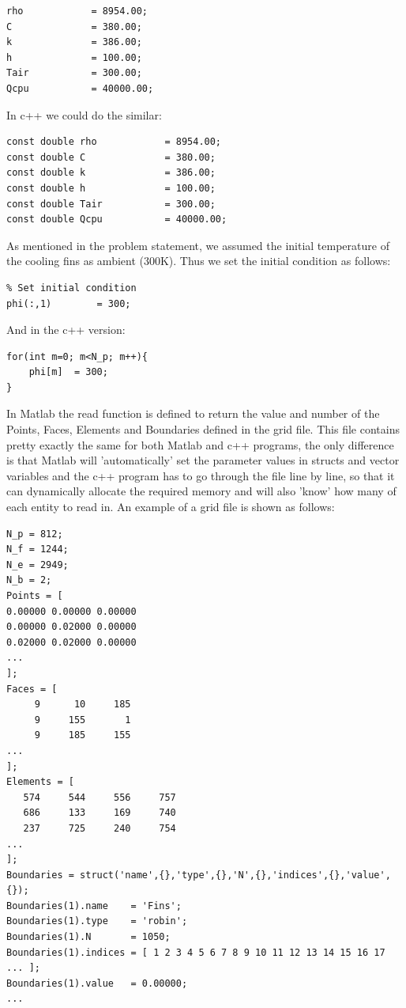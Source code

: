 \documentclass[12pt]{article}
\begin{document}
\begin{lstlisting}
rho            = 8954.00;
C              = 380.00;
k              = 386.00;
h              = 100.00;
Tair           = 300.00;
Qcpu           = 40000.00;
\end{lstlisting}

In c++ we could do the similar:

\begin{lstlisting}[style=MyC++Style]
const double rho            = 8954.00;
const double C              = 380.00;
const double k              = 386.00;
const double h              = 100.00;
const double Tair           = 300.00;
const double Qcpu           = 40000.00;
\end{lstlisting}

As mentioned in the problem statement, we assumed the initial temperature of the cooling fins as ambient (300K). Thus we set the initial condition as follows:

\begin{lstlisting}
% Set initial condition
phi(:,1)        = 300;
\end{lstlisting}

And in the c++ version:

\begin{lstlisting}[style=MyC++Style]
for(int m=0; m<N_p; m++){
	phi[m]	= 300;
}
\end{lstlisting}

In Matlab the read function is defined to return the value and number of the Points, Faces, Elements and Boundaries defined in the grid file. This file contains pretty exactly the same for both Matlab and c++ programs, the only difference is that Matlab will 'automatically' set the parameter values in structs and vector variables and the c++ program has to go through the file line by line, so that it can dynamically allocate the required memory and will also 'know' how many of each entity to read in. An example of a grid file is shown as follows:

\begin{lstlisting}
N_p = 812;
N_f = 1244;
N_e = 2949;
N_b = 2;
Points = [
0.00000	0.00000	0.00000
0.00000	0.02000	0.00000
0.02000	0.02000	0.00000
...
];
Faces = [
     9	    10	   185
     9	   155	     1
     9	   185	   155
...
];
Elements = [
   574	   544	   556	   757
   686	   133	   169	   740
   237	   725	   240	   754
...
];
Boundaries = struct('name',{},'type',{},'N',{},'indices',{},'value',{});
Boundaries(1).name    = 'Fins';
Boundaries(1).type    = 'robin';
Boundaries(1).N       = 1050;
Boundaries(1).indices = [ 1 2 3 4 5 6 7 8 9 10 11 12 13 14 15 16 17 ... ];
Boundaries(1).value   = 0.00000;
...
\end{lstlisting}
\end{document}
